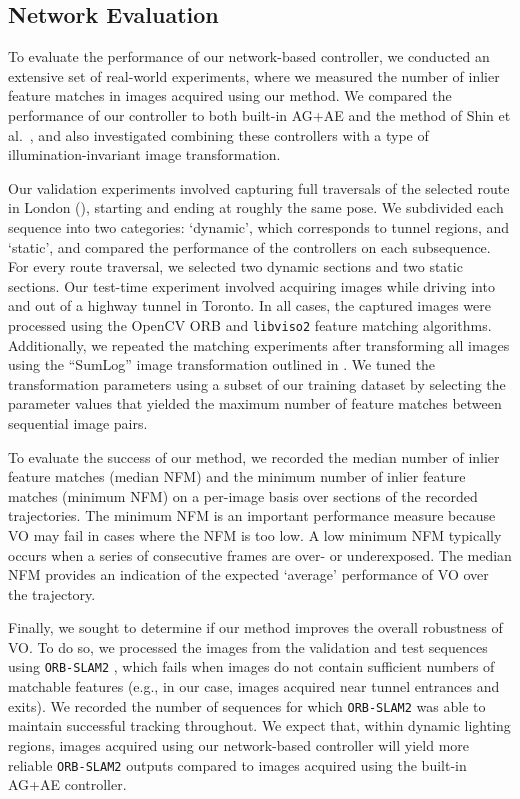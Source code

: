 \documentclass[letterpaper, 10pt, journal, twoside]{IEEEtran}
\begin{document}
\subsection{Network Evaluation}

To evaluate the performance of our network-based controller, we conducted an extensive set of real-world experiments, where we measured the number of inlier feature matches in images acquired using our method. 
We compared the performance of our controller to both built-in AG+AE and the method of Shin et al.\ \cite{Shin2019}, and also investigated combining these controllers with a type of illumination-invariant image transformation. 

Our validation experiments involved capturing full traversals of the selected route in London (), starting and ending at roughly the same pose.
We subdivided each sequence into two categories: `dynamic', which corresponds to tunnel regions, and `static', and compared the performance of the controllers on each subsequence.
For every route traversal, we selected two dynamic sections and two static sections. 
Our test-time experiment involved acquiring images while driving into and out of a highway tunnel in Toronto.
In all cases, the captured images were processed using the OpenCV ORB \cite{Rublee2011a} and \texttt{libviso2} \cite{Ji2016} feature matching algorithms.
Additionally, we repeated the matching experiments after transforming all images using the ``SumLog'' image transformation outlined in \cite{Clement2020}. We tuned the transformation parameters using a subset of our training dataset by selecting the parameter values that yielded the maximum number of feature matches between sequential image pairs.

To evaluate the success of our method, we recorded the median number of inlier feature matches (median NFM) and the minimum number of inlier feature matches (minimum NFM) on a per-image basis over sections of the recorded trajectories. 
The minimum NFM is an important performance measure because VO may fail in cases where the NFM is too low. 
A low minimum NFM typically occurs when a series of consecutive frames are over- or underexposed.
The median NFM provides an indication of the expected `average' performance of VO over the trajectory.

Finally, we sought to determine if our method improves the overall robustness of VO.
To do so, we processed the images from the validation and test sequences using \texttt{ORB-SLAM2} \cite{mur2015}, which fails when images do not contain sufficient numbers of matchable features (e.g., in our case, images acquired near tunnel entrances and exits).
We recorded the number of sequences for which \texttt{ORB-SLAM2} was able to maintain successful tracking throughout.
We expect that, within dynamic lighting regions, images acquired using our network-based controller will yield more reliable \texttt{ORB-SLAM2} outputs compared to images acquired using the built-in AG+AE controller.
\end{document}
